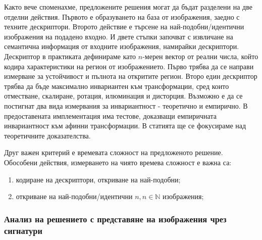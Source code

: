 \documentclass[a4paper,12pt]{article}
\begin{document}
Както вече споменахме, предложените решения могат да бъдат разделени на две отделни действия. Първото е образуването на база от изображения, заедно с техните дескриптори. Второто действие е търсене на най-подобни/идентични изображения на подадено входно. И двете стъпки започват с извличане на семантична информация от входните изображения, намирайки дескриптори. Дескриптор в практиката дефинираме като $n$-мерен вектор от реални числа, който кодира характеристики на регион от изображението. Първо трябва да се направи измерване за устойчивост и пълнота на откритите регион. Второ един дескриптор трябва да бъде максимално инвариантен към трансформации, сред които отместване, скалиране, ротация, илюминация и дисторция. Възможно е да се постигнат два вида измервания за инвариантност - теоретично и емпирично. В предоставената имплементация има тестове, доказващи емпиричната инвариантност към афинни трансформации. В статията ще се фокусираме над теоретичните доказателства.

\bigbreak

Друг важен критерий е времевата сложност на предложеното решение. Обособени действия, измерването на чиято времева сложност е важна са:

\begin{enumerate}
    \item кодиране на дескриптори, откриване на най-подобни;
    \item откриване на най-подобни/идентични $n, n \in \mathbb{N}$ изображения;
\end{enumerate}

\subsubsection{Анализ на решението с представяне на изображения чрез сигнатури}
\end{document}
